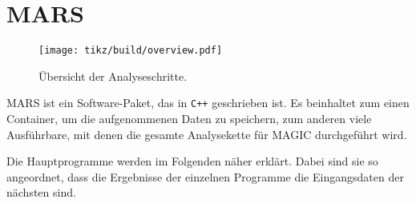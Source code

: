 \section{MARS}%
\label{sec:mars}

\begin{wrapfigure}[33]{r}{0.5\textwidth}
  \centering
  \texttt{[image: tikz/build/overview.pdf]}
  \caption{Übersicht der Analyseschritte.}%
  \label{fig:uebersicht}
\end{wrapfigure}

MARS ist ein Software-Paket, das in \texttt{C++} geschrieben ist.
Es beinhaltet zum einen Container, um die aufgenommenen Daten zu speichern,
zum anderen viele Ausführbare,
mit denen die gesamte Analysekette für MAGIC durchgeführt wird.

Die Hauptprogramme werden im Folgenden näher erklärt.
Dabei sind sie so angeordnet, dass die Ergebnisse der einzelnen
Programme die Eingangsdaten der nächsten sind.











